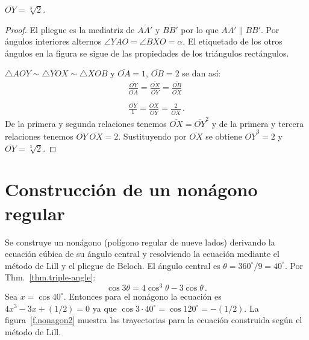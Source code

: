 \begin{theorem}
$\overline{OY}=\sqrt[3]{2}$.
\end{theorem}
\begin{proof}
El pliegue es la mediatriz de $\overline{AA'}$ y $\overline{BB'}$ por lo que $\overline{AA'}\parallel\overline{BB'}$. Por ángulos interiores alternos $\angle YAO =\angle BXO=\alpha$. El etiquetado de los otros ángulos en la figura se sigue de las propiedades de los triángulos rectángulos.

$\triangle AOY\sim \triangle YOX \sim \triangle XOB$ y $\overline{OA}=1$, $\overline{OB}=2$ se dan así:
\[
\begin{array}{l}
\displaystyle\frac{\overline{OY}}{\overline{OA}}=\displaystyle\frac{\overline{OX}}{\overline{OY}}=\displaystyle\frac{\overline{OB}}{\overline{OX}}\\
\\
\displaystyle\frac{\overline{OY}}{1}=\displaystyle\frac{\overline{OX}}{\overline{OY}}=\displaystyle\frac{2}{\overline{OX}}\,.
\end{array}
\]
De la primera y segunda relaciones tenemos $\overline{OX}=\overline{OY}^2$ y de la primera y tercera relaciones tenemos $\overline{OY}\:\overline{OX}=2$.
Sustituyendo por $\overline{OX}$ se obtiene $\overline{OY}^3=2$ y
$\overline{OY}=\sqrt[3]{2}$.
\end{proof}

\section{Construcción de un nonágono regular}\label{s.nonagon}

Se construye un nonágono (polígono regular de nueve lados) derivando la ecuación cúbica de su ángulo central y resolviendo la ecuación mediante el método de Lill y el pliegue de Beloch. El ángulo central es $\theta=360^\circ/9=40^\circ$. Por Thm.~\ref{thm.triple-angle}:
\[
\cos 3\theta=4\cos^3 \theta -3\cos\theta\,.
\]
Sea $x=\cos 40^{\circ}$. Entonces para el nonágono la ecuación es $4x^3-3x+(1/2)=0$ ya que $\cos 3\cdot 40^\circ=\cos 120^\circ=-(1/2)$. La figura~\ref{f.nonagon2} muestra las trayectorias para la ecuación construida según el método de Lill.

